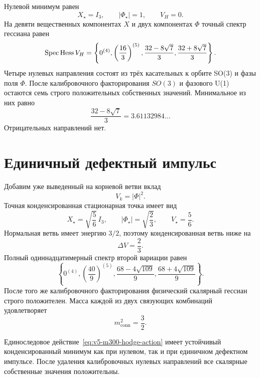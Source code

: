 Нулевой минимум равен
\begin{equation}
 X_\star=I_3,
 \qquad |\Phi_\star|=1,
 \qquad V_H=0.
\end{equation}
На девяти вещественных компонентах $X$ и двух компонентах $\Phi$
точный спектр гессиана равен
\begin{equation}
 \operatorname{Spec}\operatorname{Hess} V_H=
 \left\{
 0^{(4)},
 \left(\frac{16}{3}\right)^{(5)},
 \frac{32-8\sqrt7}{3},
 \frac{32+8\sqrt7}{3}
 \right\}.
 \label{eq:v5-m300-zero-hessian}
\end{equation}
Четыре нулевых направления состоят из трёх касательных к орбите SO(3) и
фазы поля $\Phi$. После калибровочного факторирования $SO(3)$ и фазового
U(1) остаются семь строго положительных собственных значений. Минимальное
из них равно
\begin{equation}
 \frac{32-8\sqrt7}{3}=3.61132984\ldots
\end{equation}
Отрицательных направлений нет.

\section{Единичный дефектный импульс}

Добавим уже выведенный на корневой ветви вклад
\begin{equation}
 V_k=|\Phi|^2.
\end{equation}
Точная конденсированная стационарная точка имеет вид
\begin{equation}
 X_\star=\sqrt{\frac56}\,I_3,
 \qquad
 |\Phi_\star|=\sqrt{\frac23},
 \qquad
 V_\star=\frac56.
\end{equation}
Нормальная ветвь имеет энергию $3/2$, поэтому конденсированная ветвь ниже
на
\begin{equation}
 \Delta V=\frac23.
\end{equation}
Полный одиннадцатимерный спектр второй вариации равен
\begin{equation}
 \left\{
 0^{(4)},
 \left(\frac{40}{9}\right)^{(5)},
 \frac{68-4\sqrt{109}}9,
 \frac{68+4\sqrt{109}}9
 \right\}.
 \label{eq:v5-m300-momentum-hessian}
\end{equation}
После того же калибровочного факторирования физический скалярный гессиан
строго положителен. Масса каждой из двух связующих комбинаций удовлетворяет
\begin{equation}
 m_{\mathrm{conn}}^2=\frac32.
\end{equation}

\begin{theorem}
Единоследовое действие~\eqref{eq:v5-m300-hodge-action} имеет устойчивый
конденсированный минимум как при нулевом, так и при единичном дефектном
импульсе. После удаления калибровочных нулевых направлений все скалярные
собственные значения положительны.
\end{theorem}

